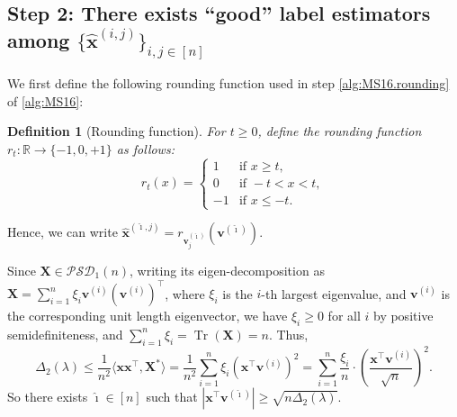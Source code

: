 \documentclass[11pt, titlepage]{article} %
\numberwithin{equation}{section}
\newtheorem{definition}{Definition}
\theoremstyle{definition}
\numberwithin{theorem}{section}
\numberwithin{lemma}{section}
\numberwithin{corollary}{section}
\numberwithin{proposition}{section}
\numberwithin{definition}{section}
\numberwithin{remark}{section}
\begin{document}
\subsection{Step 2: There exists ``good'' label estimators among $\{\hat{\bm{x}}^{(i,j)}\}_{i,j \in [n]}$}
We first define the following rounding function used in step \ref{alg:MS16.rounding} of \cref{alg:MS16}:
\begin{definition}[Rounding function]
For $t \geq 0$, define the \emph{rounding function} $r_t: \mathbb{R} \to \{-1, 0, +1\}$ as follows:
\[r_t(x) = 
\begin{cases}
1 & \text{if } x \geq t,\\
0 & \text{if } -t < x < t,\\
-1 & \text{if } x \leq -t.
\end{cases}
\]
\end{definition}
Hence, we can write $\hat{\bm{x}}^{(\hat{\imath}, j)} = r_{\bm{v}^{(\hat{\imath})}_j}(\bm{v}^{(\hat{\imath})})$.

Since $\bm{X} \in \mathcal{PSD}_1(n)$, writing its eigen-decomposition as $\bm{X} = \sum_{i=1}^{n} \xi_i \bm{v}^{(i)} (\bm{v}^{(i)})^\top$,
where $\xi_i$ is the $i$-th largest eigenvalue, and $\bm{v}^{(i)}$ is the corresponding unit length eigenvector, 
we have $\xi_i \geq 0$ for all $i$ by positive semidefiniteness, and $\sum_{i=1}^{n} \xi_i = \operatorname{Tr}(\bm{X}) = n$. Thus,
\[
\Delta_2 (\lambda) \leq \frac{1}{n^2} \langle \bm{x}\bm{x}^\top, \bm{X}^* \rangle 
= \frac{1}{n^2} \sum_{i=1}^{n} \xi_i (\bm{x}^\top \bm{v}^{(i)})^2
= \sum_{i=1}^{n} \frac{\xi_i}{n} \cdot \left(\frac{\bm{x}^\top \bm{v}^{(i)}}{\sqrt{n}}\right)^2.
\]
So there exists $\hat{\imath} \in [n]$ such that $|\bm{x}^\top \bm{v}^{(\hat{\imath})}| \geq \sqrt{n\Delta_2(\lambda)}$.
\end{document}
